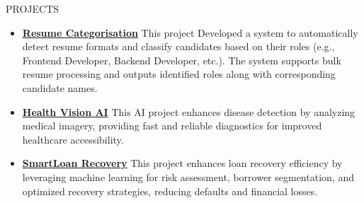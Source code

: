 \documentclass{resume}
\begin{document}
\vspace{1em}
\begin{rSection}{PROJECTS}
    \begin{itemize}
        \item \textbf{\href{https://github.com}{Resume Categorisation}} {This project Developed a system to automatically detect resume formats and classify candidates based on their roles (e.g., Frontend Developer, Backend Developer, etc.). The system supports bulk resume processing and outputs identified roles along with corresponding candidate names.}
        \vspace{-0.2em}
        \item \textbf{\href{https://github.com}{Health Vision AI}} {This AI project enhances disease detection by analyzing medical imagery, providing fast and reliable diagnostics for improved healthcare accessibility.}
        \vspace{-0.2em}
        \item \textbf{\href{https://github.com}{SmartLoan Recovery}} {This project enhances loan recovery efficiency by leveraging machine learning for risk assessment, borrower segmentation, and optimized recovery strategies, reducing defaults and financial losses.}
        \vspace{-0.2em}
    \end{itemize}
\end{rSection}
\vspace{1em}
\end{document}
